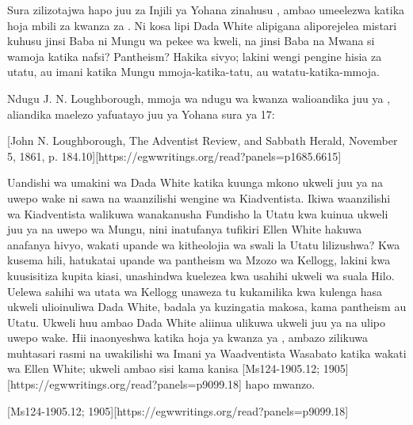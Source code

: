 Sura zilizotajwa hapo juu za Injili ya Yohana zinahusu , ambao umeelezwa katika hoja mbili za kwanza za . Ni kosa lipi Dada White alipigana aliporejelea mistari kuhusu jinsi Baba ni Mungu wa pekee wa kweli, na jinsi Baba na Mwana si wamoja katika nafsi? Pantheism? Hakika sivyo; lakini wengi pengine hisia za utatu, au imani katika Mungu mmoja-katika-tatu, au watatu-katika-mmoja.



Ndugu J. N. Loughborough, mmoja wa ndugu wa kwanza walioandika juu ya , aliandika maelezo yafuatayo juu ya Yohana sura ya 17:


[John N. Loughborough, The Adventist Review, and Sabbath Herald, November 5, 1861, p. 184.10][https://egwwritings.org/read?panels=p1685.6615]


Uandishi wa umakini wa Dada White katika kuunga mkono ukweli juu ya  na uwepo wake ni sawa na waanzilishi wengine wa Kiadventista. Ikiwa waanzilishi wa Kiadventista walikuwa wanakanusha Fundisho la Utatu kwa kuinua ukweli juu ya  na uwepo wa Mungu, nini inatufanya tufikiri Ellen White hakuwa anafanya hivyo, wakati upande wa kitheolojia wa swali la Utatu lilizushwa? Kwa kusema hili, hatukatai upande wa pantheism wa Mzozo wa Kellogg, lakini kwa kuusisitiza kupita kiasi, unashindwa kuelezea kwa usahihi ukweli wa suala Hilo. Uelewa sahihi wa utata wa Kellogg unaweza tu kukamilika kwa kulenga hasa ukweli ulioinuliwa Dada White, badala ya kuzingatia makosa, kama pantheism au Utatu. Ukweli huu ambao Dada White aliinua ulikuwa ukweli juu ya  na ulipo uwepo wake. Hii inaonyeshwa katika hoja ya kwanza ya , ambazo zilikuwa muhtasari rasmi na uwakilishi wa Imani ya Waadventista Wasabato katika wakati wa Ellen White; ukweli ambao sisi kama kanisa [Ms124-1905.12; 1905][https://egwwritings.org/read?panels=p9099.18] hapo mwanzo.


[Ms124-1905.12; 1905][https://egwwritings.org/read?panels=p9099.18]


